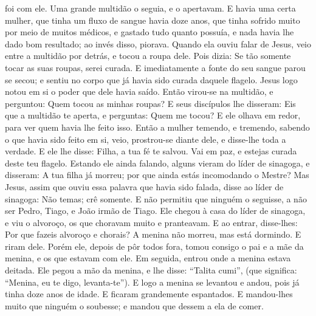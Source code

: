 {   foi com ele. Uma grande multidão o seguia, e o apertavam.
  E havia uma certa mulher, que tinha um fluxo de sangue havia doze anos,
  que tinha sofrido muito por meio de muitos médicos, e gastado tudo quanto possuía, e nada havia lhe dado bom resultado; ao invés disso, piorava.
  Quando ela ouviu falar de Jesus, veio entre a multidão por detrás, e tocou a roupa dele.
  Pois dizia: Se tão somente tocar as suas roupas, serei curada.
  E imediatamente a fonte do seu sangue parou se secou; e sentiu no corpo que já havia sido curada daquele flagelo.
  Jesus logo notou em si o poder que dele havia saído. Então virou-se na multidão, e perguntou: Quem tocou as minhas roupas?
  E seus discípulos lhe disseram: Eis que a multidão te aperta, e perguntas: Quem me tocou?
  E ele olhava em redor, para ver quem havia lhe feito isso.
  Então a mulher temendo, e tremendo, sabendo o que havia sido feito em si, veio, prostrou-se diante dele, e disse-lhe toda a verdade.
  E ele lhe disse: Filha, a tua fé te salvou. Vai em paz, e estejas curada deste teu flagelo.
  Estando ele ainda falando, alguns vieram
{} do líder de sinagoga, e disseram: A tua filha já morreu; por que ainda estás incomodando o Mestre?
  Mas Jesus, assim que ouviu essa palavra que havia sido falada, disse ao líder de sinagoga: Não temas; crê somente.
  E não permitiu que ninguém o seguisse, a não ser Pedro, Tiago, e João irmão de Tiago.
  Ele chegou à casa do líder de sinagoga, e viu o alvoroço, os que choravam muito e pranteavam.
  E ao entrar, disse-lhes: Por que fazeis alvoroço e chorais? A menina não morreu, mas está dormindo.
  E riram dele. Porém ele, depois de pôr todos fora, tomou consigo o pai e a mãe da menina, e os que estavam com ele. Em seguida, entrou onde a menina estava deitada.
  Ele pegou a mão da menina, e lhe disse: “Talita cumi”, (que significa: “Menina, eu te digo, levanta-te”).
  E logo a menina se levantou e andou, pois já tinha doze anos de idade. E ficaram grandemente espantados.
  E mandou-lhes muito que ninguém o soubesse; e mandou que dessem a ela de comer.
\par }

